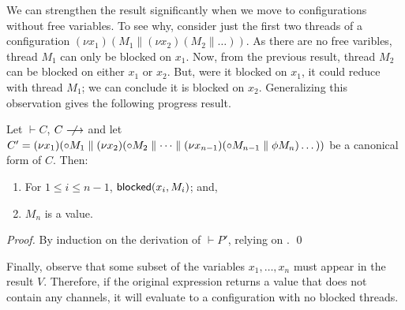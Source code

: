 \documentclass[orivec,envcountsame]{llncs}
\begin{document}
We can strengthen the result significantly when we move to configurations without free variables.
To see why, consider just the first two threads of a configuration $(\nu x_1)(M_1 \parallel (\nu
x_2)(M_2 \parallel \dots))$.  As there are no free varibles, thread $M_1$ can only be blocked on
$x_1$.  Now, from the previous result, thread $M_2$ can be blocked on either $x_1$ or $x_2$.  But,
were it blocked on $x_1$, it could reduce with thread $M_1$; we can conclude it is blocked on $x_2$.
Generalizing this observation gives the following progress result.
%
\begin{corollary}\label{thm:progress}
  Let $\vdash C$, $C \centernot\ceval$ and let $C' = (\nu x_1)({\mathord{\circ}} M_1 \parallel (\nu
  x_2)({\mathord{\circ}} M_2 \parallel \dots \parallel (\nu x_{n-1})({\mathord{\circ}} M_{n-1} \parallel
  \phi M_n)\dots))$ be a canonical form of $C$.  Then:
  \begin{enumerate}
  \item For $1 \leq i \leq n - 1$, $\mathsf{blocked}(x_i,M_i)$; and,
  \item $M_n$ is a value.
  \end{enumerate}
\end{corollary}
%
\begin{proof}
  By induction on the derivation of $\vdash P'$, relying on .  \qed
\end{proof}
%
Finally, observe that some subset of the variables $x_1,\dots,x_n$ must appear in the result $V$.
Therefore, if the original expression returns a value that does not contain any channels, it will
evaluate to a configuration with no blocked threads.
\end{document}
